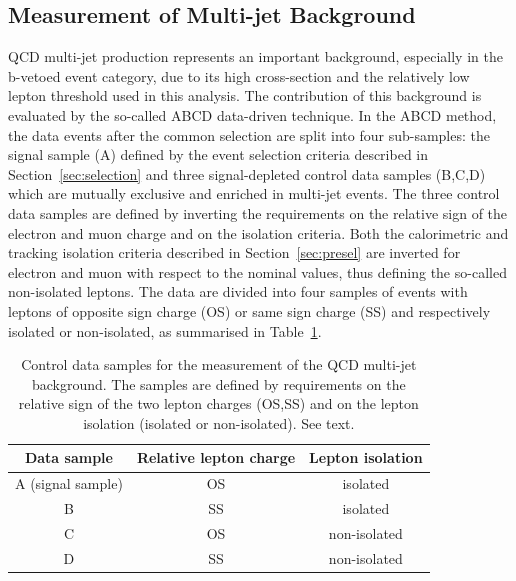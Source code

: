 \subsection{Measurement of Multi-jet Background}
\label{sec:qcd}


QCD multi-jet production represents an important background, 
especially in the b-vetoed event category, due to its high cross-section and the 
relatively low lepton \pt threshold  used in this analysis. The contribution of this
background is evaluated by the so-called ABCD data-driven technique.
In the ABCD method, the  data events after the common selection are split into four sub-samples: the
signal sample (A) defined by the event selection criteria described in Section~\ref{sec:selection}
and three signal-depleted control data samples (B,C,D) which are mutually exclusive  and 
enriched in multi-jet events. The three control data samples are defined by inverting the requirements on the relative 
sign of the electron and muon charge  and  on the isolation criteria. 
Both the calorimetric and tracking isolation criteria described in Section~\ref{sec:presel}  are inverted for  electron and muon 
with respect to the nominal values, thus defining the so-called non-isolated leptons. 
The data are divided into four samples of events with leptons of opposite sign charge (OS) 
or same sign charge (SS) and respectively isolated or non-isolated, as summarised in Table~\ref{table:qcd}.

\begin{table} [!tp]
\caption{Control data samples for the measurement of the QCD multi-jet background. The samples are defined by requirements on the relative
	sign of the two lepton charges (OS,SS) and on the lepton isolation  (isolated or non-isolated). See text.}
\centering
\begin{tabular}{c c c }
\hline
Data sample & Relative lepton charge & Lepton isolation \\ [0.5ex]
\hline
A (signal sample) & OS & isolated \\
\hline
B & SS & isolated \\
C & OS & non-isolated \\
D & SS & non-isolated \\ [1ex]
\hline
\end{tabular}
\label{table:qcd}
\end{table}


